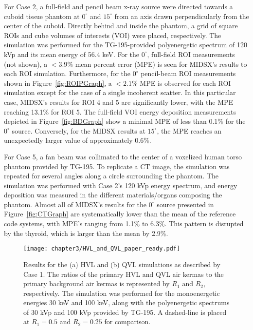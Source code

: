 \par For Case 2, a full-field and pencil beam x-ray source were directed towards a cuboid tissue phantom at $0^\circ$ and $15^\circ$ from an axis drawn perpendicularly from the center of the cuboid. Directly behind and inside the phantom, a grid of square ROIs and cube volumes of interests (VOI) were placed, respectively. The simulation was performed for the TG-195-provided polyenergetic spectrum of 120 kVp and its mean energy of 56.4 keV. For the $0^\circ$, full-field ROI measurements (not shown), a $<3.9$\% mean percent error (MPE) is seen for MIDSX's results to each ROI simulation. Furthermore, for the $0^\circ$ pencil-beam ROI measurements shown in Figure~\ref{fig:ROIPGraph}, a $<2.1$\% MPE is observed for each ROI simulation except for the case of a single incoherent scatter. In this particular case, MIDSX's results for ROI 4 and 5 are significantly lower, with the MPE reaching 13.1\% for ROI 5. The full-field VOI energy deposition measurements depicted in Figure~\ref{fig:BDGraph} show a minimal MPE of less than 0.1\% for the $0^\circ$ source. Conversely, for the MIDSX results at $15^\circ$, the MPE reaches an unexpectedly larger value of approximately 0.6\%.

\par For Case 5, a fan beam was collimated to the center of a voxelized human torso phantom provided by TG-195. To replicate a CT image, the simulation was repeated for several angles along a circle surrounding the phantom. The simulation was performed with Case 2's 120 kVp energy spectrum, and energy deposition was measured in the different materials/organs composing the phantom. Almost all of MIDSX's results for the $0^\circ$ source presented in Figure~\ref{fig:CTGraph} are systematically lower than the mean of the reference code systems, with MPE's ranging from 1.1\% to 6.3\%. This pattern is disrupted by the thyroid, which is larger than the mean by 2.9\%. 


\begin{figure}[H]
    \centering
	\texttt{[image: chapter3/HVL\_and\_QVL\_paper\_ready.pdf]}
	\caption{Results for the (a) HVL and (b) QVL simulations as described by Case 1. The ratios of the primary HVL and QVL air kermas to the primary background air kermas is represented by $R_1$ and $R_2$, respectively. The simulation was performed for the monoenergetic energies 30 keV and 100 keV, along with the polyenergetic spectrums of 30 kVp and 100 kVp provided by TG-195. A dashed-line is placed at $R_1 = 0.5$ and $R_2 = 0.25$ for comparison.}
	\label{fig:HVLGraph}
\end{figure}

